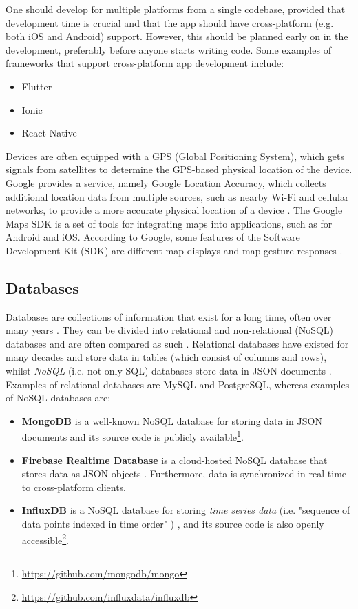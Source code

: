 \documentclass{article}
\begin{document}
One should develop for multiple platforms from a single codebase, provided that development time is crucial and that the app should have cross-platform (e.g. both iOS and Android) support. However, this should be planned early on in the development, preferably before anyone starts writing code. Some examples of frameworks that support cross-platform app development include:

\begin{itemize}
    \item Flutter
    \item Ionic
    \item React Native
\end{itemize}

Devices are often equipped with a GPS (Global Positioning System), which gets signals from satellites to determine the GPS-based physical location of the device. Google provides a service, namely Google Location Accuracy, which collects additional location data from multiple sources, such as nearby Wi-Fi and cellular networks, to provide a more accurate physical location of a device \cite{noauthor_how_nodate}. The Google Maps SDK is a set of tools for integrating maps into applications, such as for Android and iOS. According to Google, some features of the Software Development Kit (SDK) are different map displays and map gesture responses \cite{noauthor_maps_nodate}.

\subsection{Databases}\label{subsec:Databases}
Databases are collections of information that exist for a long time, often over many years \cite{garcia-molina_database_2002}. They can be divided into relational and non-relational (NoSQL) databases and are often compared as such \cite{mohamed_relational_2014}. Relational databases have existed for many decades and store data in tables (which consist of columns and rows), whilst \emph{NoSQL} (i.e. not only SQL) databases store data in JSON documents \cite{garcia-molina_database_2002, sudiartha_data_2020}. Examples of relational databases are MySQL and PostgreSQL, whereas examples of NoSQL databases are: 
\begin{itemize}
    \item \textbf{MongoDB} is a well-known NoSQL database for storing data in JSON documents and its source code is publicly available\footnote{\url{https://github.com/mongodb/mongo}}.
    \item \textbf{Firebase Realtime Database} is a cloud-hosted NoSQL database that stores data as JSON objects  \cite{noauthor_firebase_nodate}. Furthermore, data is synchronized in real-time to cross-platform clients.
    \item \textbf{InfluxDB} is a NoSQL database for storing \emph{time series data} (i.e. "sequence of data points indexed in time order" \cite{noauthor_what_nodate})  \cite{noauthor_influxdb_nodate}, and its source code is also openly accessible\footnote{\url{https://github.com/influxdata/influxdb}}.
\end{itemize}
\end{document}
